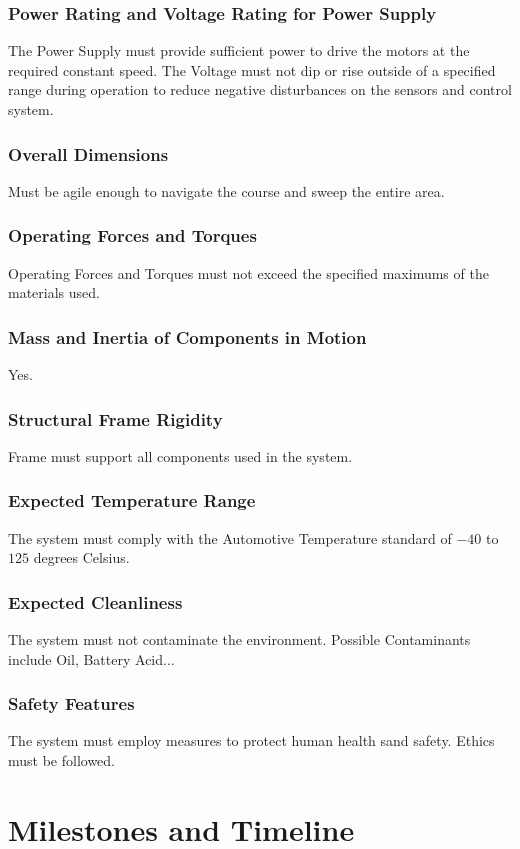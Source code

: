 \documentclass[12pt]{article}
\begin{document}
\subsubsection{Power Rating and Voltage Rating for Power Supply}
The Power Supply must provide sufficient power to drive the motors at the required constant speed. The Voltage must not dip or rise outside of a specified range during operation to reduce negative disturbances on the sensors and control system.
\subsubsection{Overall Dimensions}
Must be agile enough to navigate the course and sweep the entire area.
\subsubsection{Operating Forces and Torques}
Operating Forces and Torques must not exceed the specified maximums of the materials used.
\subsubsection{Mass and Inertia of Components in Motion}
Yes.
\subsubsection{Structural Frame Rigidity}
Frame must support all components used in the system.
\subsubsection{Expected Temperature Range}
The system must comply with the Automotive Temperature standard of $-40$ to $125$ degrees Celsius.
\subsubsection{Expected Cleanliness}
The system must not contaminate the environment. Possible Contaminants include Oil, Battery Acid...
\subsubsection{Safety Features}
The system must employ measures to protect human health sand safety. Ethics must be followed. 

\clearpage
\section{Milestones and Timeline}
\end{document}

